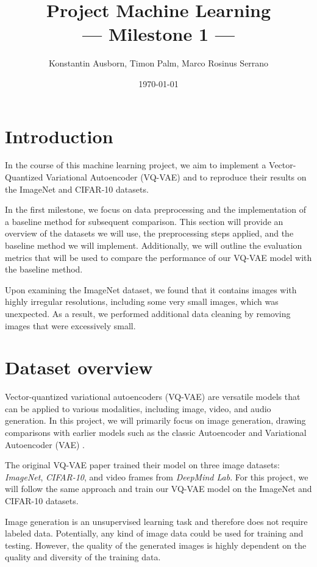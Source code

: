 \documentclass[10pt,a4paper,twoside]{article}
\title{Project Machine Learning\\--- Milestone 1 ---}
\author{Konstantin Ausborn, Timon Palm, Marco Rosinus Serrano}
\date{\today}
\begin{document}
\maketitle

\section{Introduction}
In the course of this machine learning project, we aim to implement a Vector-Quantized Variational Autoencoder (VQ-VAE) \cite{vqvae} and to reproduce their results on the ImageNet and CIFAR-10 datasets.

In the first milestone, we focus on data preprocessing and the implementation of a baseline method for subsequent comparison. This section will provide an overview of the datasets we will use, the preprocessing steps applied, and the baseline method we will implement. Additionally, we will outline the evaluation metrics that will be used to compare the performance of our VQ-VAE model with the baseline method.

Upon examining the ImageNet dataset, we found that it contains images with highly irregular resolutions, including some very small images, which was unexpected. As a result, we performed additional data cleaning by removing images that were excessively small.

\section{Dataset overview}
    Vector-quantized variational autoencoders (VQ-VAE) are versatile models that can be applied to various modalities, including image, video, and audio generation. In this project, we will primarily focus on image generation, drawing comparisons with earlier models such as the classic Autoencoder and Variational Autoencoder (VAE) \cite{vae}.

    The original VQ-VAE paper \cite{vqvae} trained their model on three image datasets: \textit{ImageNet}, \textit{CIFAR-10}, and video frames from \textit{DeepMind Lab}. For this project, we will follow the same approach and train our VQ-VAE model on the ImageNet and CIFAR-10 datasets.

    Image generation is an unsupervised learning task and therefore does not require labeled data. Potentially, any kind of image data could be used for training and testing. However, the quality of the generated images is highly dependent on the quality and diversity of the training data.
\end{document}
